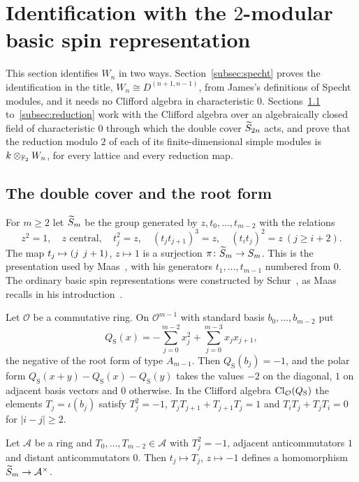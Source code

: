 \section{Identification with the \texorpdfstring{$2$}{2}-modular basic spin representation}\label{sec:spin}

This section identifies $W_n$ in two ways. Section~\ref{subsec:specht} proves the identification in the title, $W_n\cong D^{(n+1,n-1)}$, from James's definitions of Specht modules, and it needs no Clifford algebra in characteristic $0$. Sections~\ref{subsec:cover} to~\ref{subsec:reduction} work with the Clifford algebra over an algebraically closed field of characteristic $0$ through which the double cover $\widetilde{S}_{2n}$ acts, and prove that the reduction modulo $2$ of each of its finite-dimensional simple modules is $k\otimes_{\mathbb{F}_2}W_n$, for every lattice and every reduction map.

\subsection{The double cover and the root form}\label{subsec:cover}

For $m\ge2$ let $\widetilde{S}_m$ be the group generated by $z,t_0,\dots,t_{m-2}$ with the relations
\[
z^2=1,\quad z\text{ central},\quad t_j^2=z,\quad {(t_{j}t_{j+1})}^3=z,\quad {(t_{i}t_j)}^2=z\ (j\ge i+2).
\]
The map $t_j\mapsto(j\;\,j+1)$, $z\mapsto1$ is a surjection $\pi\colon\widetilde{S}_m\to S_m$. This is the presentation used by Maas~\cite{Maas10}, with his generators $t_1,\dots,t_{m-1}$ numbered from $0$. The ordinary basic spin representations were constructed by Schur~\cite{Schur11}, as Maas recalls in his introduction~\cite{Maas10}.

Let $\mathcal O$ be a commutative ring. On $\mathcal O^{m-1}$ with standard basis $b_0,\dots,b_{m-2}$ put
\[
Q_{\mathrm S}(x)=-\sum_{j=0}^{m-2}x_j^2+\sum_{j=0}^{m-3}x_{j}x_{j+1},
\]
the negative of the root form of type $A_{m-1}$. Then $Q_{\mathrm S}(b_j)=-1$, and the polar form $Q_{\mathrm S}(x+y)-Q_{\mathrm S}(x)-Q_{\mathrm S}(y)$ takes the values $-2$ on the diagonal, $1$ on adjacent basis vectors and $0$ otherwise. In the Clifford algebra $\operatorname{Cl}_{\mathcal O}(Q_{\mathrm S})$ the elements $T_j=\iota(b_j)$ satisfy $T_j^2=-1$, $T_{j}T_{j+1}+T_{j+1}T_j=1$ and $T_{i}T_j+T_{j}T_i=0$ for $|i-j|\ge2$.

\begin{lemma}\label{lem:schurhom}
Let $\mathcal A$ be a ring and $T_0,\dots,T_{m-2}\in\mathcal A$ with $T_j^2=-1$, adjacent anticommutators $1$ and distant anticommutators $0$. Then $t_j\mapsto T_j$, $z\mapsto-1$ defines a homomorphism $\widetilde{S}_m\to\mathcal A^\times$.
\end{lemma}

